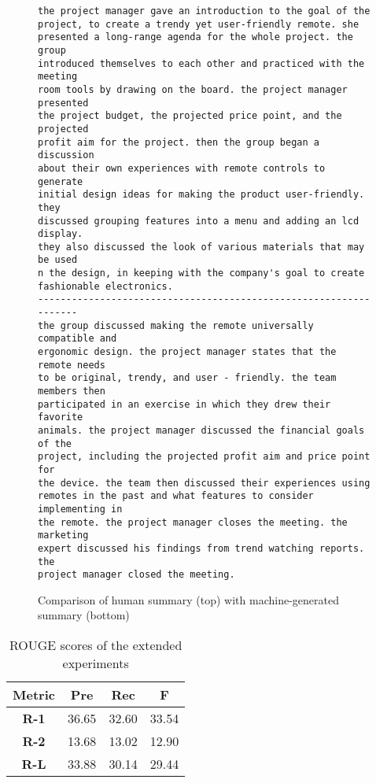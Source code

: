 \begin{figure}[h]
\begin{lstlisting}[numbers=none]
the project manager gave an introduction to the goal of the
project, to create a trendy yet user-friendly remote. she
presented a long-range agenda for the whole project. the group
introduced themselves to each other and practiced with the meeting
room tools by drawing on the board. the project manager presented
the project budget, the projected price point, and the projected
profit aim for the project. then the group began a discussion
about their own experiences with remote controls to generate
initial design ideas for making the product user-friendly. they
discussed grouping features into a menu and adding an lcd display.
they also discussed the look of various materials that may be used 
n the design, in keeping with the company's goal to create
fashionable electronics. 
------------------------------------------------------------------
the group discussed making the remote universally compatible and
ergonomic design. the project manager states that the remote needs
to be original, trendy, and user - friendly. the team members then
participated in an exercise in which they drew their favorite
animals. the project manager discussed the financial goals of the
project, including the projected profit aim and price point for
the device. the team then discussed their experiences using
remotes in the past and what features to consider implementing in
the remote. the project manager closes the meeting. the marketing
expert discussed his findings from trend watching reports. the
project manager closed the meeting. 
\end{lstlisting}
\caption{Comparison of human summary (top) with machine-generated summary (bottom)}
\label{fig:extended-experiment-example}
\end{figure}

\begin{table}[h]
\centering
\begin{tabular}{@{}clll@{}}
\toprule
\textbf{Metric} & \multicolumn{1}{c}{\textbf{Pre}} & \multicolumn{1}{c}{\textbf{Rec}} & \multicolumn{1}{c}{\textbf{F}} \\ \midrule
\textbf{R-1}    & 36.65                           & 32.60                           & 33.54                         \\
\textbf{R-2}    & 13.68                           & 13.02                           & 12.90                         \\
\textbf{R-L}    & 33.88                           & 30.14                           & 29.44                         \\ \bottomrule
\end{tabular}
\caption{ROUGE scores of the extended experiments}
\label{tab:extended-experiment-rouge}
\end{table}

